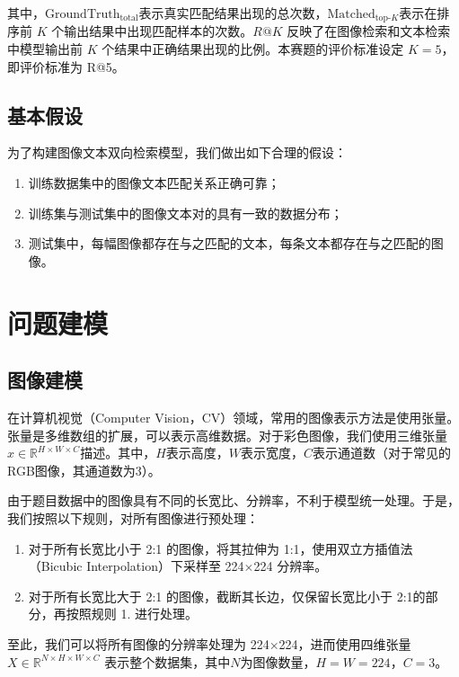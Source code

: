 \documentclass[a4paper]{zreport}
\begin{document}
其中，$\mathrm{GroundTruth}_{\text{total}}$表示真实匹配结果出现的总次数，$\mathrm{Matched}_{\text{top-}K}$表示在排序前 $K$ 个输出结果中出现匹配样本的次数。$R@K$ 反映了在图像检索和文本检索中模型输出前 $K$ 个结果中正确结果出现的比例。本赛题的评价标准设定 $K=5$，即评价标准为 R@5。

\subsection{基本假设}

为了构建图像文本双向检索模型，我们做出如下合理的假设：

\begin{enumerate}
\item 训练数据集中的图像文本匹配关系正确可靠；
\item 训练集与测试集中的图像文本对的具有一致的数据分布；
\item 测试集中，每幅图像都存在与之匹配的文本，每条文本都存在与之匹配的图像。
\end{enumerate}

\newpage

\section{问题建模}

\subsection{图像建模}

在计算机视觉（Computer Vision，CV）领域，常用的图像表示方法是使用张量。张量是多维数组的扩展，可以表示高维数据。对于彩色图像，我们使用三维张量$x \in \mathbb{R}^{H \times W \times C}$描述。其中，$H$表示高度，$W$表示宽度，$C$表示通道数（对于常见的RGB图像，其通道数为3）。

由于题目数据中的图像具有不同的长宽比、分辨率，不利于模型统一处理。于是，我们按照以下规则，对所有图像进行预处理：

\begin{enumerate}
\item 对于所有长宽比小于 2:1 的图像，将其拉伸为 1:1，使用双立方插值法（Bicubic Interpolation）下采样至 224$\times$224 分辨率。
\item 对于所有长宽比大于 2:1 的图像，截断其长边，仅保留长宽比小于 2:1的部分，再按照规则 1. 进行处理。
\end{enumerate}

至此，我们可以将所有图像的分辨率处理为 224$\times$224，进而使用四维张量 $X \in \mathbb{R}^{N \times H \times W \times C}$ 表示整个数据集，其中$N$为图像数量，$H=W=224$，$C=3$。
\end{document}
